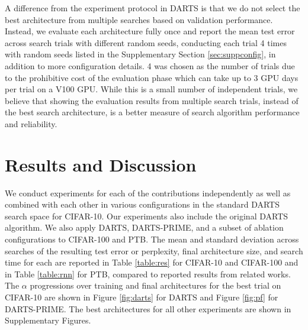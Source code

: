 \documentclass[letterpaper]{article} \usepackage{aaai22}  \usepackage{times}  \usepackage{helvet}  \usepackage{courier}  \usepackage[hyphens]{url}  \usepackage{graphicx} \urlstyle{rm} \def\UrlFont{\rm}  \usepackage{natbib}  \usepackage{caption} \DeclareCaptionStyle{ruled}{labelfont=normalfont,labelsep=colon,strut=off} \frenchspacing  \setlength{\pdfpagewidth}{8.5in}  \setlength{\pdfpageheight}{11in}  \usepackage{algorithm}
\begin{document}
A difference from the experiment protocol in DARTS is that we do not select the best architecture from multiple searches based on validation performance. Instead, we evaluate each architecture fully once and report the mean test error across search trials with different random seeds, conducting each trial 4 times with random seeds listed in the Supplementary Section \ref{sec:suppconfig}, in addition to more configuration details. 4 was chosen as the number of trials due to the prohibitive cost of the evaluation phase which can take up to 3 GPU days per trial on a V100 GPU. While this is a small number of independent trials, we believe that showing the evaluation results from multiple search trials, instead of the best search architecture, is a better measure of search algorithm performance and reliability. 

\section{Results and Discussion}

We conduct experiments for each of the contributions independently as well as combined with each other in various configurations in the standard DARTS search space for CIFAR-10. Our experiments also include the original DARTS algorithm. We also apply DARTS, DARTS-PRIME, and a subset of ablation configurations to CIFAR-100 and PTB. The mean and standard deviation across searches of the resulting test error or perplexity, final architecture size, and search time for each are reported in Table \ref{table:res} for CIFAR-10 and CIFAR-100 and in Table \ref{table:rnn} for PTB, compared to reported results from related works. The $\alpha$ progressions over training and final architectures for the best trial on CIFAR-10 are shown in Figure \ref{fig:darts} for DARTS and Figure \ref{fig:pf} for DARTS-PRIME. The best architectures for all other experiments are shown in Supplementary Figures.
\end{document}
